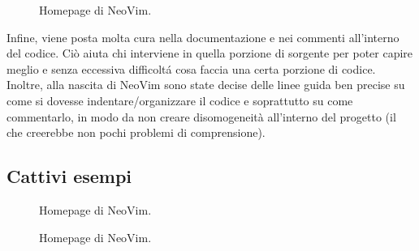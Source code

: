 \documentclass[12pt]{article} %
\begin{document}
\begin{figure}[H] 
\caption{Homepage di NeoVim.}
\label{fig:buonesempio3}
\end{figure}

Infine, viene posta molta cura nella documentazione e nei commenti all'interno del codice. Ciò aiuta chi interviene in quella porzione di sorgente per poter capire meglio e senza eccessiva difficolt\'a cosa faccia una certa porzione di codice.\\
Inoltre, alla nascita di NeoVim sono state decise delle linee guida ben precise su come si dovesse indentare/organizzare il codice e soprattutto su come commentarlo, in modo da non creare disomogeneità all'interno del progetto (il che creerebbe non pochi problemi di comprensione).

\subsection{Cattivi esempi}

\begin{figure}[H] 
\caption{Homepage di NeoVim.}
\label{fig:cattivoesempio1}
\end{figure}

\begin{figure}[H] 
\caption{Homepage di NeoVim.}
\label{fig:cattivoesempio2}
\end{figure}
\end{document}
